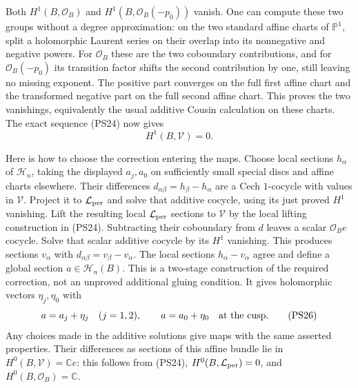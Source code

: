 \documentclass[11pt,a4paper]{article}
\theoremstyle{plain}
\theoremstyle{definition}
\begin{document}
Both $H^1(B,\mathcal O_B)$ and
$H^1(B,\mathcal O_B(-p_0))$ vanish. One can compute these two
groups without a degree approximation: on the two standard affine
charts of $\mathbb P^1$, split a holomorphic Laurent series on
their overlap into its nonnegative and negative powers. For
$\mathcal O_B$ these are the two coboundary contributions, and
for $\mathcal O_B(-p_0)$ its transition factor shifts the second
contribution by one, still leaving no missing exponent. The positive
part converges on the full first affine chart and the transformed
negative part on the full second affine chart. This proves the two
vanishings, equivalently the usual additive Cousin calculation on
these charts. The exact sequence (PS24) now gives
\[
                             H^1(B,\mathcal V)=0.
 \tag{PS25}\label{pshift:eq:no-analytic-obstruction}
\]

Here is how to choose the correction entering the maps. Choose
local sections $h_\alpha$ of $\mathscr H_n$, taking the displayed
$a_j,a_0$ on sufficiently small special discs and affine charts
elsewhere. Their differences $d_{\alpha\beta}=h_\beta-h_\alpha$
are a Cech $1$-cocycle with values in $\mathcal V$. Project it to
$\mathcal L_{\rm per}$ and solve that additive cocycle, using its just proved
$H^1$ vanishing. Lift the resulting local $\mathcal L_{\rm per}$ sections to
$\mathcal V$ by the local lifting construction in (PS24). Subtracting
their coboundary from $d$ leaves a scalar $\mathcal O_Be$ cocycle.
Solve that scalar additive cocycle by its $H^1$ vanishing. This
produces sections $v_\alpha$ with
$d_{\alpha\beta}=v_\beta-v_\alpha$. The local sections
$h_\alpha-v_\alpha$ agree and define a global section
$a\in\mathscr H_n(B)$. This is a two-stage construction of the
required correction, not an unproved additional gluing condition.
It gives holomorphic vectors $\eta_j,\eta_0$ with
\[
 a=a_j+\eta_j\quad(j=1,2),\qquad a=a_0+\eta_0
                              \quad\hbox{at the cusp}.
 \tag{PS26}\label{pshift:eq:global-correction}
\]
Any choices made in the additive solutions give maps with the same
asserted properties. Their differences as sections of this affine
bundle lie in $H^0(B,\mathcal V)=\mathbb C e$: this follows from
(PS24), $H^0(B,\mathcal L_{\rm per})=0$, and $H^0(B,\mathcal O_B)=\mathbb C$.
\end{document}
